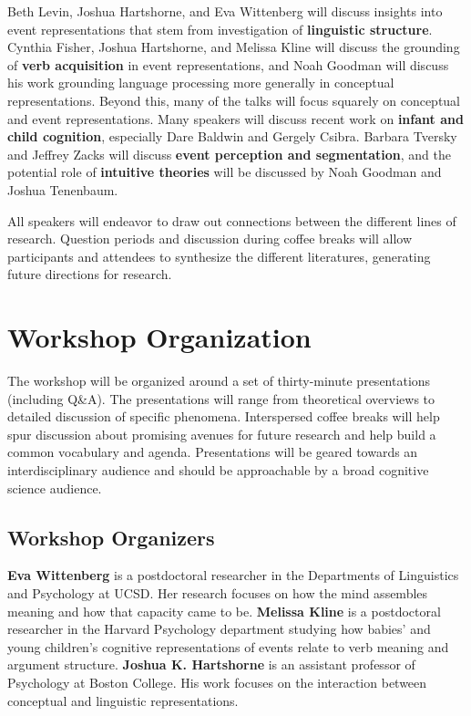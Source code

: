 \documentclass[10pt,letterpaper]{article}
\begin{document}
Beth Levin, Joshua Hartshorne, and Eva Wittenberg will discuss insights into event
representations that stem from investigation of \textbf{linguistic structure}. Cynthia Fisher, Joshua Hartshorne, and
Melissa Kline will discuss the grounding of \textbf{verb acquisition} in event representations, and Noah Goodman
will discuss his work grounding language processing more generally in
conceptual representations. Beyond this, many of the talks will focus squarely on {conceptual and event representations}. Many speakers
will discuss recent work on \textbf{infant and child cognition}, especially Dare Baldwin and
Gergely Csibra. Barbara Tversky and Jeffrey Zacks will discuss \textbf{event
perception and segmentation}, and the potential role of
\textbf{intuitive theories} will be discussed by Noah Goodman and
Joshua Tenenbaum.

All speakers will endeavor to draw out connections between the
different lines of research. Question periods and discussion during
coffee breaks will allow participants and attendees
to synthesize the different literatures, generating future directions
for research.

\section{Workshop Organization}

The workshop will be organized around a set of thirty-minute
presentations (including Q\&A). The presentations will range from
theoretical overviews to detailed discussion of specific
phenomena. Interspersed coffee breaks will help spur discussion about
promising avenues for future research and help build a common
vocabulary and agenda. Presentations will be geared towards an
interdisciplinary audience and should be approachable by a broad
cognitive science audience.

\subsection{Workshop Organizers}

\textbf{Eva Wittenberg} is a postdoctoral researcher in the
Departments of Linguistics and Psychology at UCSD. Her research
focuses on how the mind assembles meaning and how that capacity came
to be. \textbf{Melissa Kline} is a postdoctoral researcher in the Harvard Psychology department studying how babies' and young children's cognitive representations of events relate to verb meaning and argument structure.
\textbf{Joshua K. Hartshorne} is an assistant professor of
Psychology at Boston College. His work focuses on the interaction
between conceptual and linguistic representations.
\end{document}
